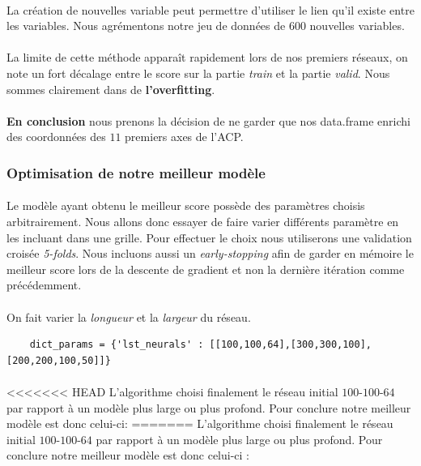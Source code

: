 \documentclass[14pt, openany]{article}
\begin{document}
\paragraph{}
La création de nouvelles variable peut permettre d'utiliser le lien qu'il existe entre les variables. Nous agrémentons notre jeu de données de $600$ nouvelles variables.

\paragraph{}
La limite de cette méthode apparaît rapidement lors de nos premiers réseaux, on note un fort décalage entre le score sur la partie \textit{train} et la partie \textit{valid}. Nous sommes clairement dans de \textbf{l'overfitting}.


\paragraph{}
\textbf{En conclusion} nous prenons la décision de ne garder que nos data.frame enrichi des coordonnées des $11$ premiers axes de l'ACP.

\subsubsection{Optimisation de notre meilleur modèle}
\paragraph{}
Le modèle ayant obtenu le meilleur score possède des paramètres choisis arbitrairement. Nous allons donc essayer de faire varier différents paramètre en les incluant dans une grille. Pour effectuer le choix nous utiliserons une validation croisée \textit{5-folds}. Nous incluons aussi un \textit{early-stopping} afin de garder en mémoire le meilleur score lors de la descente de gradient et non la dernière itération comme précédemment.

\paragraph{}
On fait varier la \textit{longueur} et la \textit{largeur} du réseau.
\begin{verbatim}
    dict_params = {'lst_neurals' : [[100,100,64],[300,300,100],[200,200,100,50]]}
\end{verbatim}

\paragraph{}
<<<<<<< HEAD
L'algorithme choisi finalement le réseau initial $100$-$100$-$64$ par rapport à un modèle plus large ou plus profond. Pour conclure notre meilleur modèle est donc celui-ci:
=======
L'algorithme choisi finalement le réseau initial $100$-$100$-$64$ par rapport à un modèle plus large ou plus profond. Pour conclure notre meilleur modèle est donc celui-ci :
\end{document}
